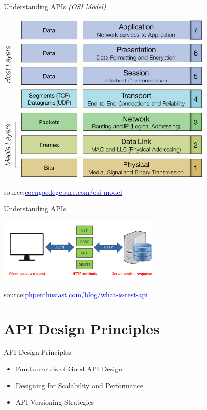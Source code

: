 \documentclass{beamer}
\begin{document}
\begin{frame}{Understanding APIs \small{\textit{(OSI Model)}}}
	\begin{center}
    		\includegraphics[width=0.8\textwidth, height=0.7\textheight]{img/osi-model.png}
  \end{center}
  
  \tiny { source:\href{https://www.coengoedegebure.com/osi-model}{\textcolor{blue}{coengoedegebure.com/osi-model}}}
\end{frame}

\begin{frame}{Understanding APIs}
	\begin{center}
    		\includegraphics[width=0.6\textwidth, height=0.4\textheight]{img/api-client-to-server.png}
  \end{center}
  
  \tiny { source:\href{https://phpenthusiast.com/blog/what-is-rest-api}{\textcolor{blue}{phpenthusiast.com/blog/what-is-rest-api}}}
\end{frame}
 
\section{API Design Principles}
\begin{frame}{API Design Principles}
  \begin{itemize}
    \item Fundamentals of Good API Design
    \item Designing for Scalability and Performance
    \item API Versioning Strategies
  \end{itemize}
\end{frame}
\end{document}
